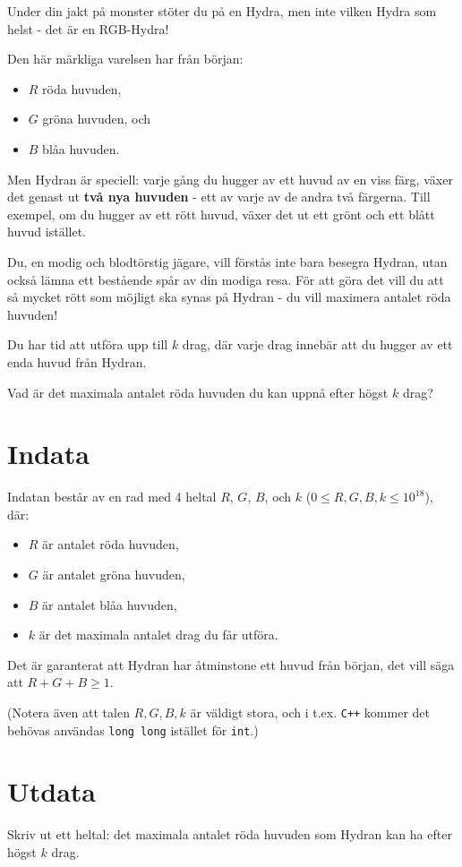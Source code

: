 \noindent
Under din jakt på monster stöter du på en Hydra, men inte vilken Hydra som helst - det är en RGB-Hydra!

Den här märkliga varelsen har från början:
\begin{itemize}
    \item $R$ röda huvuden,
    \item $G$ gröna huvuden, och
    \item $B$ blåa huvuden.
\end{itemize}

Men Hydran är speciell: varje gång du hugger av ett huvud av en viss färg, växer det genast ut \textbf{två nya huvuden} - ett av varje av de andra två färgerna. Till exempel, om du hugger av ett rött huvud, växer det ut ett grönt och ett blått huvud istället.

Du, en modig och blodtörstig jägare, vill förstås inte bara besegra Hydran, utan också lämna ett bestående spår av din modiga resa. För att göra det vill du att så mycket rött som möjligt ska synas på Hydran - du vill maximera antalet röda huvuden!

Du har tid att utföra upp till $k$ drag, där varje drag innebär att du hugger av ett enda huvud från Hydran.

Vad är det maximala antalet röda huvuden du kan uppnå efter högst $k$ drag?

\section*{Indata}
Indatan består av en rad med 4 heltal $R$, $G$, $B$, och $k$ ($0 \leq R, G, B, k \leq 10^{18}$), där:
\begin{itemize}
    \item $R$ är antalet röda huvuden,
    \item $G$ är antalet gröna huvuden,
    \item $B$ är antalet blåa huvuden,
    \item $k$ är det maximala antalet drag du får utföra.
\end{itemize}

Det är garanterat att Hydran har åtminstone ett huvud från början, det vill säga att $R + G + B \geq 1$.

(Notera även att talen $R,G,B,k$ är väldigt stora, och i t.ex. \texttt{C++} kommer det behövas användas \texttt{long long} istället för \texttt{int}.)

\section*{Utdata}
Skriv ut ett heltal: det maximala antalet röda huvuden som Hydran kan ha efter högst $k$ drag.

